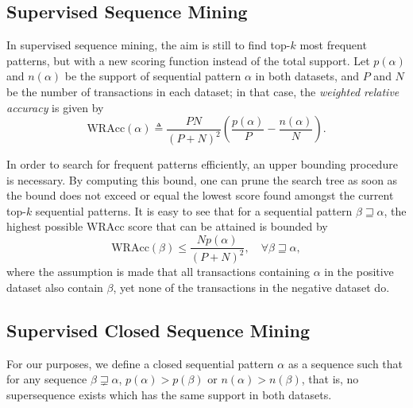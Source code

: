 \documentclass{sigkddExp}
\newcommand{\wracc}{\mathrm{WRAcc}}
\begin{document}
\subsection{Supervised Sequence Mining}
\label{sec:ssm}
In supervised sequence mining, the aim is still to find top-\(k\) most frequent patterns, but with a new scoring function instead of the total support.
Let \(p(\alpha)\) and \(n(\alpha)\) be the support of sequential pattern \(\alpha\) in both datasets, and \(P\) and \(N\) be the number of transactions in each dataset; in that case, the \emph{weighted relative accuracy} is given by
\begin{equation}
\wracc(\alpha) \triangleq \frac{PN}{(P + N)^2} \left(\frac{p(\alpha)}{P} - \frac{n(\alpha)}{N}\right).
\end{equation}

In order to search for frequent patterns efficiently, an upper bounding procedure is necessary.
By computing this bound, one can prune the search tree as soon as the bound does not exceed or equal the lowest score found amongst the current top-\(k\) sequential patterns.
It is easy to see that for a sequential pattern \(\beta \sqsupseteq \alpha\), the highest possible \(\wracc\) score that can be attained is bounded by
\begin{equation}
\wracc(\beta) \leqslant \frac{N p(\alpha)}{(P + N)^2}, \quad \forall \beta \sqsupseteq \alpha,
\end{equation}
where the assumption is made that all transactions containing \(\alpha\) in the positive dataset also contain \(\beta\), yet none of the transactions in the negative dataset do.

\subsection{Supervised Closed Sequence Mining}
\label{sec:scsm}
For our purposes, we define a closed sequential pattern \(\alpha\) as a sequence such that for any sequence \(\beta \sqsupsetneq \alpha\), \(p(\alpha) > p(\beta)\) or \(n(\alpha) > n(\beta)\), that is, no supersequence exists which has the same support in both datasets.
\end{document}

